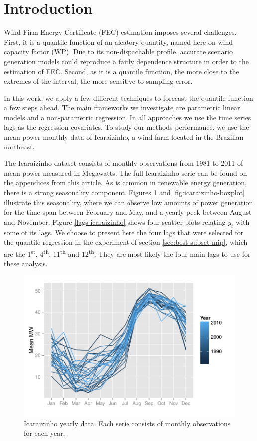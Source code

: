 \section{Introduction}

Wind Firm Energy Certificate (FEC) \cite{porrua2010wind} estimation imposes several challenges. First, it is a quantile function of an aleatory quantity, named here on wind capacity factor (WP). Due to its non-dispachable profile, accurate scenario generation models could reproduce a fairly dependence structure in order to the estimation of FEC. Second, as it is a quantile function, the more close to the extremes of the interval, the more sensitive to sampling error.

In this work, we apply a few different techniques to forecast the quantile function a few steps ahead. The main frameworks we investigate are parametric linear models and a non-parametric regression. In all approaches we use the time series lags as the regression covariates. To study our methods performance, we use the mean power monthly data of Icaraizinho, a wind farm located in the Brazilian northeast. 

The Icaraizinho dataset consists of monthly observations from 1981 to 2011 of mean power measured in Megawatts. The full Icaraizinho serie can be found on the appendices from this article.  As is common in renewable energy generation, there is a strong seasonality component. Figures \ref{fig:icaraizinho-mensal} and \ref{fig:icaraizinho-boxplot} illustrate this seasonality, where we can observe low amounts of power generation for the time span between February and May, and a yearly peek between August and November.  
Figure \ref{lags-icaraizinho} shows four scatter plots relating $y_t$ with some of its lags. We choose to present here the four lags that were selected for the quantile regression in the experiment of section \ref{sec:best-subset-mip}, which are the 1\textsuperscript{st}, 4\textsuperscript{th}, 11\textsuperscript{th} and 12\textsuperscript{th}. They are most likely the four main lags to use for these analysis.
\begin{figure}[h]
\centering
\includegraphics[width=0.8\linewidth]{./Figuras/Icaraizinho/icaraizinho-mensal}
\caption{Icaraizinho yearly data. Each serie consists of monthly observations for each year.}
\label{fig:icaraizinho-mensal}
\end{figure}



